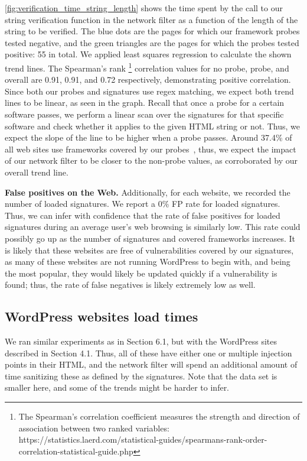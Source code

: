  \autoref{fig:verification_time_string_length} shows the time spent by the call to our string verification function in the network filter as a function of the length of the string to be verified. The blue dots are the pages for which our framework probes tested negative, and the green triangles are the pages for which the probes tested positive: 55 in total. We applied least squares regression to calculate the shown trend lines. The Spearman's rank \footnote{The Spearman's correlation coefficient measures the strength and direction of association between two ranked variables: https://statistics.laerd.com/statistical-guides/spearmans-rank-order-correlation-statistical-guide.php} correlation values for no probe, probe, and overall are 0.91, 0.91, and 0.72 respectively, demonstrating positive correlation. Since both our probes and signatures use regex matching, we expect both trend lines to be linear, as seen in the graph. Recall that once a probe for a certain software passes, we perform a linear scan over the signatures for that specific software and check whether it applies to the given HTML string or not. Thus, we expect the slope of the line to be higher when a probe passes. Around 37.4\% of all web sites use frameworks covered by our probes~\cite{w3stats}, thus, we expect the impact of our network filter to be closer to the non-probe values, as corroborated by our overall trend line.
 

\textbf{False positives on the Web.} Additionally, for each website, we recorded the number of loaded signatures. We report a 0\% FP rate for loaded signatures. Thus, we can infer with confidence that the rate of false positives for loaded signatures during an average user's web browsing is similarly low. This rate could possibly go up as the number of signatures and covered frameworks increases. It is likely that these websites are free of vulnerabilities covered by our signatures, as many of these websites are not running WordPress to begin with, and being the most popular, they would likely be updated quickly if a vulnerability is found; thus, the rate of false negatives is likely extremely low as well.

\subsection{WordPress websites load times} \label{wordpress_sites}

We ran similar experiments as in Section 6.1, but with the WordPress sites described in Section 4.1. Thus, all of these have either one or multiple injection points in their HTML, and the network filter will spend an additional amount of time sanitizing these as defined by the signatures. Note that the data set is smaller here, and some of the trends might be harder to infer.

